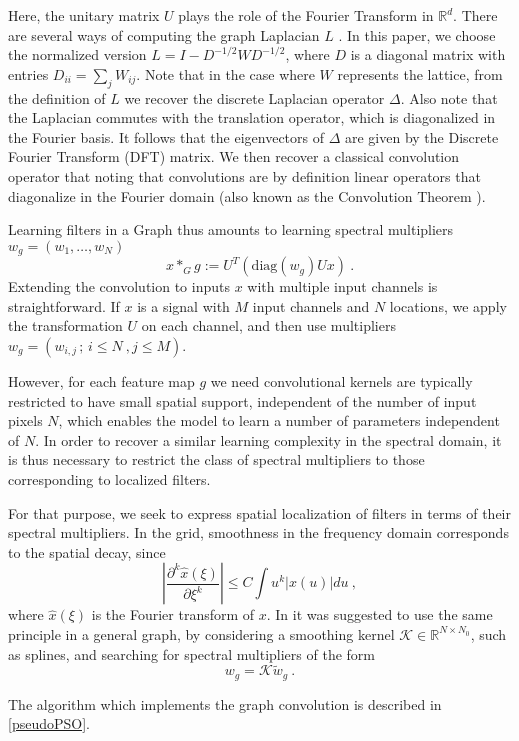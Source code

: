 \documentclass{article} %
\begin{document}
Here, the unitary matrix $U$ plays the role of the Fourier Transform in $\mathbb{R}^d$. 
There are several ways of computing the graph Laplacian $L$ \cite{belkin2001laplacian}. In this paper, we choose the normalized version $L = I - D^{-1/2}WD^{-1/2}$, where $D$ is a diagonal matrix with entries $D_{ii} = \sum_j W_{ij}$. Note that in the case where $W$ represents the lattice, from the definition of $L$ we recover the discrete Laplacian operator $\Delta$. Also note that the Laplacian commutes with the translation operator, which is diagonalized in the Fourier basis. 
It follows that the eigenvectors of $\Delta$ are given by the Discrete Fourier Transform (DFT) matrix. 
We then recover a classical convolution operator that noting that convolutions are by definition linear operators that diagonalize in the Fourier domain (also known as the Convolution Theorem \cite{mallat1999wavelet}).

Learning filters in a Graph thus amounts to learning spectral multipliers $w_g = (w_1, \dots,w_N)$ 
$$x \ast_G g := U^T ( \mbox{diag}(w_g) U x)~.$$
Extending the convolution to inputs $x$ with multiple input channels is straightforward. If $x$ is a signal with $M$ input channels and $N$ locations, we apply the transformation $U$ on each channel, and then use multipliers $w_g =  (w_{i,j}\, ;\, i \leq N~, j \leq M)$. 

However, for each feature map $g$ we need convolutional kernels are typically restricted to have small spatial support, independent of the number of input pixels $N$, which enables the model to learn a number of parameters independent of $N$. In order to recover a similar learning complexity in the spectral domain, it is thus necessary to restrict the class of spectral multipliers to those corresponding to localized filters. 

For that purpose, we seek to express spatial localization of filters in terms of their spectral multipliers. In the grid, smoothness in the frequency domain corresponds to the spatial decay, since
$$\left| \frac{\partial^k \hat{x}(\xi)}{\partial \xi^k} \right| \leq C \int u^k |x(u)| du~,$$
where $\hat{x}(\xi)$ is the Fourier transform of $x$.
In \cite{spectralnet2013} it was suggested to use the same principle in a general graph, by considering a smoothing kernel $\mathcal{K} \in \mathbb{R}^{N \times N_0}$, such as splines, and searching for spectral multipliers of the form
$$w_g = \mathcal{K} \tilde{w}_g~.$$

The algorithm which implements the graph convolution is described in \ref{pseudoPSO}.
\end{document}
